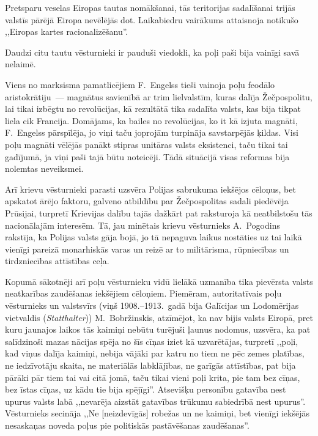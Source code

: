 \documentclass[twoside,a5paper,12pt,fleqn,openany]{extbook}
\newcommand{\detxti}[1]{\textit{\textgerman{#1}}}
\begin{document}
Pretsparu veselas Eiropas tautas nomākšanai, tās teritorijas sadalīšanai trijās valstīs pārējā Eiropa nevēlējās dot. Laikabiedru vairākums attaisnoja notikušo ,,Eiropas kartes racionalizēšanu''.

Daudzi citu tautu vēsturnieki ir pauduši viedokli, ka poļi paši bija vainīgi savā nelaimē.

Viens no marksisma pamatlicējiem F.~Engelss tieši vainoja poļu feodālo aristokrātiju~--- magnātus savienībā ar trim lielvalstīm, kuras dalīja Žečpospolitu, lai tikai izbēgtu no revolūcijas, kā rezultātā tika sadalīta valsts, kas bija tikpat liela cik Francija. Domājams, ka bailes no revolūcijas, ko it kā izjuta magnāti, F.~Engelss pārspīlēja, jo viņi taču joprojām turpināja savstarpējās ķildas. Visi poļu magnāti vēlējās panākt stipras unitāras valsts eksistenci, taču tikai tai gadījumā, ja viņi paši tajā būtu noteicēji. Tādā situācijā visas reformas bija nolemtas neveiksmei.

Arī krievu vēsturnieki parasti uzsvēra Polijas sabrukuma iekšējos cēloņus, bet apskatot ārējo faktoru, galveno atbildību par Žečpospolitas sadali piedēvēja Prūsijai, turpretī Krievijas dalību tajās dažkārt pat raksturoja kā neatbilstošu tās nacionālajām interesēm. Tā, jau minētais krievu vēsturnieks A.~Pogodins rakstīja, ka Polijas valsts gāja bojā, jo tā nepaguva laikus nostāties uz tai laikā vienīgi pareizā monarhiskās varas un reizē ar to militārisma, rūpniecības un tirdzniecības attīstības ceļa.

Kopumā sākotnēji arī poļu vēsturnieku vidū lielākā uzmanība tika pievērsta valsts neatkarības zaudēšanas iekšējiem cēloņiem. Piemēram, autoritatīvais poļu vēsturnieks un valstsvīrs (viņš 1908.--1913.~gadā bija Galīcijas un Lodomērijas vietvaldis (\detxti{Statthalter})) M.~Bobržinskis, atzīmējot, ka nav bijis valsts Eiropā, pret kuru jaunajos laikos tās kaimiņi nebūtu turējuši ļaunus nodomus, uzsvēra, ka pat salīdzinoši mazas nācijas spēja no šīs cīņas iziet kā uzvarētājas, turpretī ,,poļi, kad viņus dalīja kaimiņi, nebija vājāki par katru no tiem ne pēc zemes platības, ne iedzīvotāju skaita, ne materiālās labklājības, ne garīgās attīstības, pat bija pārāki pār tiem tai vai citā jomā, taču tikai vieni poļi krita, pie tam bez cīņas, bez īstas cīņas, uz kādu tie bija spējīgi''. Atsevišķu personību gatavība nest upurus valsts labā ,,nevarēja aizstāt gatavības trūkumu sabiedrībā nest upurus''. Vēsturnieks secināja ,,Ne [neizdevīgās] robežas un ne kaimiņi, bet vienīgi iekšējās nesaskaņas noveda poļus pie politiskās pastāvēšanas zaudēšanas''.
\end{document}
